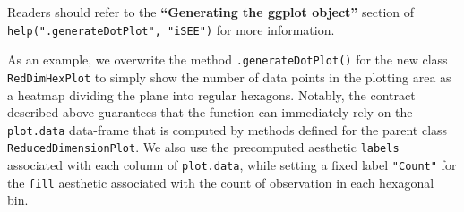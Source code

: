 \documentclass[]{book}
\newenvironment{Shaded}{\begin{snugshade}}{\end{snugshade}}
\newcommand{\KeywordTok}[1]{\textcolor[rgb]{0.13,0.29,0.53}{\textbf{#1}}}
\newcommand{\DataTypeTok}[1]{\textcolor[rgb]{0.13,0.29,0.53}{#1}}
\newcommand{\StringTok}[1]{\textcolor[rgb]{0.31,0.60,0.02}{#1}}
\newcommand{\CommentTok}[1]{\textcolor[rgb]{0.56,0.35,0.01}{\textit{#1}}}
\newcommand{\ControlFlowTok}[1]{\textcolor[rgb]{0.13,0.29,0.53}{\textbf{#1}}}
\newcommand{\OperatorTok}[1]{\textcolor[rgb]{0.81,0.36,0.00}{\textbf{#1}}}
\newcommand{\NormalTok}[1]{#1}
\begin{document}
Readers should refer to the \textbf{``Generating the ggplot object''}
section of \texttt{help(".generateDotPlot",\ "iSEE")} for more
information.

As an example, we overwrite the method \texttt{.generateDotPlot()} for
the new class \texttt{RedDimHexPlot} to simply show the number of data
points in the plotting area as a heatmap dividing the plane into regular
hexagons. Notably, the contract described above guarantees that the
function can immediately rely on the \texttt{plot.data} data-frame that
is computed by methods defined for the parent class
\texttt{ReducedDimensionPlot}. We also use the precomputed aesthetic
\texttt{labels} associated with each column of \texttt{plot.data}, while
setting a fixed label \texttt{"Count"} for the \texttt{fill} aesthetic
associated with the count of observation in each hexagonal bin.

\begin{Shaded}
\end{Shaded}
\end{document}
